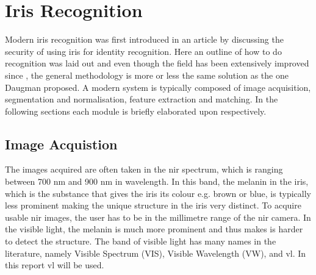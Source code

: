 \section{Iris Recognition}
\label{sec:Iris_Recognition_Research}
Modern iris recognition was first introduced in an article by \cite{Daugman1993} discussing the security of using iris for identity recognition. Here an outline of how to do recognition was laid out and even though the field has been extensively improved since \cite{Daugman1993}, the general methodology is more or less the same solution as the one Daugman proposed. A modern system is typically composed of image acquisition, segmentation and normalisation, feature extraction and matching. In the following sections each module is briefly elaborated upon respectively.

\subsection{Image Acquistion}
The images acquired are often taken in the \gls{nir} spectrum, which is ranging between 700 nm and 900 nm in wavelength. In this band, the melanin in the iris, which is the substance that gives the iris its colour e.g. brown or blue, is typically less prominent making the unique structure in the iris very distinct. To acquire usable \gls{nir} images, the user has to be in the millimetre range of the \gls{nir} camera. In the visible light, the melanin is much more prominent and thus makes is harder to detect the structure. The band of visible light has many names in the literature, namely Visible Spectrum (VIS), Visible Wavelength (VW), and \gls{vl}. In this report \gls{vl} will be used. 

